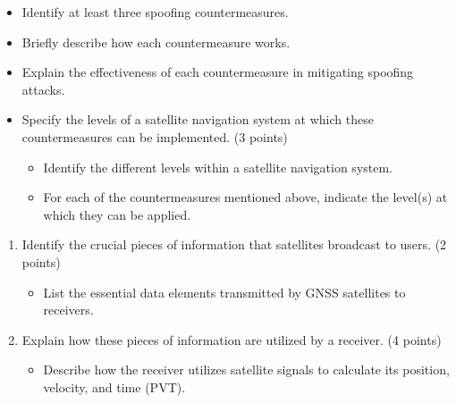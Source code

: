 \begin{questions}


\begin{itemize}
    \item Identify at least three spoofing countermeasures.
    \item Briefly describe how each countermeasure works.
    \item Explain the effectiveness of each countermeasure in mitigating spoofing attacks.
    \item Specify the levels of a satellite navigation system at which these countermeasures can be implemented. (3 points)
    \begin{itemize}
        \item Identify the different levels within a satellite navigation system.
        \item For each of the countermeasures mentioned above, indicate the level(s) at which they can be applied.
    \end{itemize}
\end{itemize}


\begin{enumerate}
    \item Identify the crucial pieces of information that satellites broadcast to users. (2 points)
    \begin{itemize}
        \item List the essential data elements transmitted by GNSS satellites to receivers.
    \end{itemize}
    \item Explain how these pieces of information are utilized by a receiver. (4 points)
    \begin{itemize}
        \item Describe how the receiver utilizes satellite signals to calculate its position, velocity, and time (PVT).
    \end{itemize}
\end{enumerate}


\end{questions}

